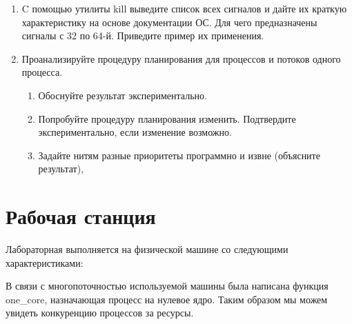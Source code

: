\documentclass[a4paper]{article}
\begin{document}
\begin{enumerate}
\begin{enumerate}
		\item C помощью утилиты kill выведите список всех сигналов и дайте их
краткую характеристику на основе документации ОС. Для чего
предназначены сигналы с 32 по 64-й. Приведите пример их применения.

		\item Проанализируйте процедуру планирования для процессов и потоков одного процесса.
		\begin{enumerate}
			\item Обоснуйте результат экспериментально. 
			\item Попробуйте процедуру планирования изменить. Подтвердите экспериментально, если изменение возможно.
			\item Задайте нитям разные приоритеты программно и извне (объясните результат),
		\end{enumerate}
	\end{enumerate}
\end{enumerate}
	
\section{Рабочая станция}
	Лабораторная выполняется на физической машине со следующими характеристиками:
	
	
	В связи с многопоточностью используемой машины была написана функция one\_core, назначающая процесс на нулевое ядро. Таким образом мы можем увидеть конкуренцию процессов за ресурсы.
	
	
	
	
	
\end{document}
